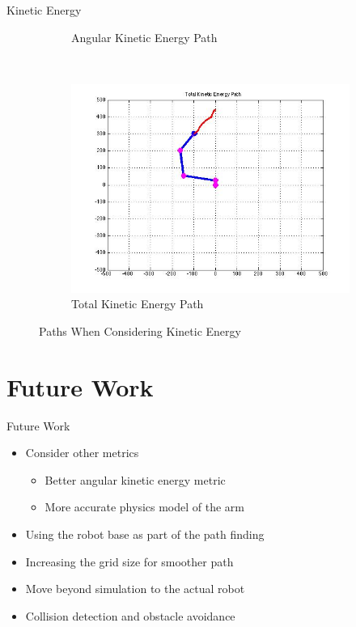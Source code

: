 \documentclass{beamer}
\begin{document}
\begin{frame}{Kinetic Energy}
\begin{figure}[htb]
\begin{subfigure}[b]{0.33\textwidth}
\caption{Angular Kinetic Energy Path}
\end{subfigure}%
~ 
\begin{subfigure}[b]{0.33\textwidth}
\centering
\includegraphics[scale=.135]{PathPics/Energy_Kinetic_Path.jpg}
\caption{Total Kinetic Energy Path}
\end{subfigure}

\caption{Paths When Considering Kinetic Energy}
\label{fig:EnergyPaths2}
\end{figure}
\end{frame}

\section{Future Work}
\begin{frame}{Future Work}
\begin{itemize}
\item Consider other metrics\\
\begin{itemize}
\item Better angular kinetic energy metric
\item More accurate physics model of the arm
\end{itemize}
\item Using the robot base as part of the path finding
\item Increasing the grid size for smoother path
\item Move beyond simulation to the actual robot
\item Collision detection and obstacle avoidance
\end{itemize}
\end{frame}
\end{document}
